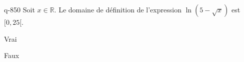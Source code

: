 \begin{truefalse}{q-850}
Soit $x\in \mathbb R$. Le domaine de définition de l'expression $\ln(5-\sqrt  x)$ est $[0,25[$.
\item* Vrai
\item Faux
\end{truefalse}

